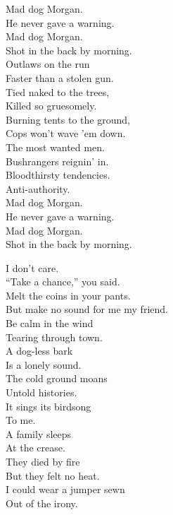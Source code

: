 Mad dog Morgan. \\
He never gave a warning. \\
Mad dog Morgan. \\
Shot in the back by morning. \\

Outlaws on the run \\
Faster than a stolen gun. \\
Tied naked to the trees, \\
Killed so gruesomely. \\

Burning tents to the ground, \\
Cops won't wave 'em down. \\
The most wanted men. \\
Bushrangers reignin' in. \\

Bloodthirsty tendencies. \\
Anti-authority. \\

Mad dog Morgan. \\
He never gave a warning. \\
Mad dog Morgan. \\
Shot in the back by morning. \\





I don't care. \\
``Take a chance,'' you said. \\
Melt the coins in your pants. \\
But make no sound for me my friend. \\

Be calm in the wind \\
Tearing through town. \\
A dog-less bark \\
Is a lonely sound. \\

The cold ground moans \\
Untold histories. \\
It sings its birdsong \\
To me. \\

A family sleeps \\
At the crease. \\
They died by fire \\
But they felt no heat. \\
I could wear a jumper sewn \\
Out of the irony. \\


